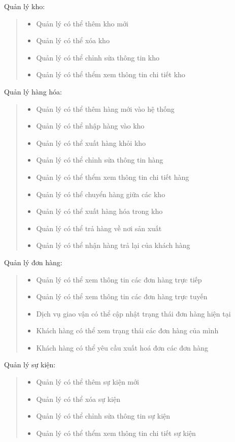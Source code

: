 Quản lý kho:
\begin{quote}
    \begin{itemize}
        \item Quản lý có thể thêm kho mới
        \item Quản lý có thể xóa kho
        \item Quản lý có thể chỉnh sửa thông tin kho
        \item Quản lý có thể thểm xem thông tin chi tiết kho
    \end{itemize}
\end{quote}

Quản lý hàng hóa:
\begin{quote}
    \begin{itemize}
        \item Quản lý có thể thêm hàng mới vào hệ thống
        \item Quản lý có thể nhập hàng vào kho
        \item Quản lý có thể xuất hàng khỏi kho
        \item Quản lý có thể chỉnh sửa thông tin hàng
        \item Quản lý có thể thểm xem thông tin chi tiết hàng
        \item Quản lý có thể chuyển hàng giữa các kho
        \item Quản lý có thể xuất hàng hóa trong kho
        \item Quản lý có thể trả hàng về nơi sản xuất
        \item Quản lý có thể nhận hàng trả lại của khách hàng
    \end{itemize}
\end{quote}

Quản lý đơn hàng:
\begin{quote}
    \begin{itemize}
        \item Quản lý có thể xem thông tin các đơn hàng trực tiếp
        \item Quản lý có thể xem thông tin các đơn hàng trực tuyến
        \item Dịch vụ giao vận có thể cập nhật trạng thái đơn hàng hiện tại
        \item Khách hàng có thể xem trạng thái các đơn hàng của mình
        \item Khách hàng có thể yêu cầu xuất hoá đơn các đơn hàng
    \end{itemize}
\end{quote}

Quản lý sự kiện:
\begin{quote}
    \begin{itemize}
        \item Quản lý có thể thêm sự kiện mới
        \item Quản lý có thể xóa sự kiện
        \item Quản lý có thể chỉnh sửa thông tin sự kiện
        \item Quản lý có thể thểm xem thông tin chi tiết sự kiện
    \end{itemize}
\end{quote}

